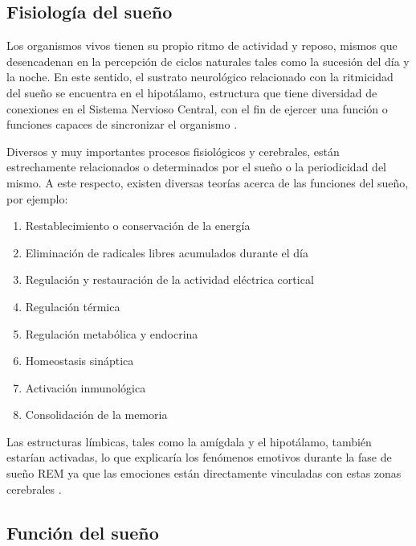 \subsection{Fisiolog\'ia del sueño}


Los organismos vivos tienen su propio ritmo de actividad y reposo, mismos que desencadenan en la 
percepci\'on de ciclos naturales tales como la sucesión del d\'ia y la noche. En este sentido, 
el sustrato neurol\'ogico relacionado con la ritmicidad del sueño se encuentra en el hipot\'alamo, 
estructura que tiene diversidad de conexiones en el Sistema Nervioso Central, con el fin de 
ejercer una funci\'on o funciones capaces de sincronizar el organismo 
\cite{FernandezConde07,Cabrera14}.

Diversos y muy importantes procesos fisiol\'ogicos y cerebrales, est\'an estrechamente 
relacionados o determinados por el sue\~no o la periodicidad del mismo. A este respecto, existen 
diversas teor\'ias acerca de las funciones del sue\~no, por ejemplo: 
\begin{enumerate}
\item Restablecimiento o conservaci\'on de la energ\'ia
\item Eliminaci\'on de radicales libres acumulados durante el d\'ia
\item Regulaci\'on y restauraci\'on de la actividad el\'ectrica cortical
\item Regulación t\'ermica
\item Regulación metabólica y endocrina
\item Homeostasis sin\'aptica
\item Activaci\'on inmunol\'ogica
\item Consolidaci\'on de la memoria
\end{enumerate}

Las estructuras l\'imbicas, tales como la am\'igdala y el hipot\'alamo, tambi\'en estar\'ian 
activadas, lo que explicar\'ia los fen\'omenos emotivos durante la fase de sue\~no REM ya que 
las emociones est\'an directamente vinculadas con estas zonas cerebrales \cite{Bonet08}.


\subsection{Funci\'on del sue\~no}

